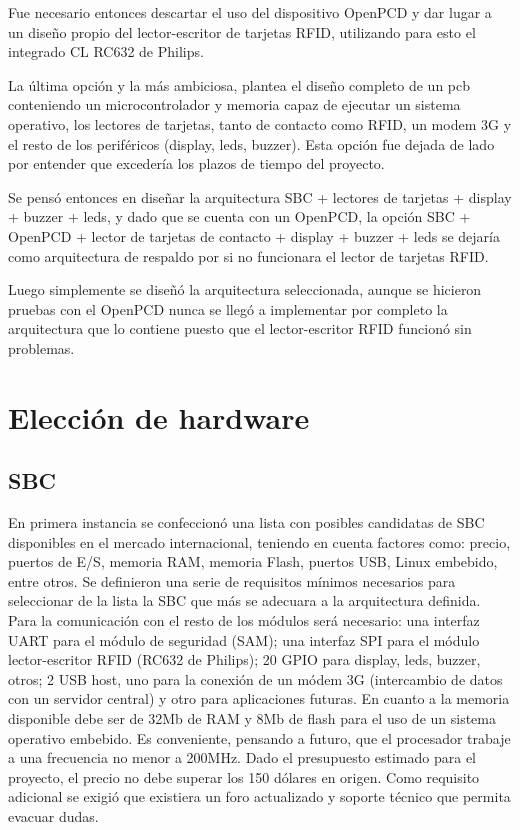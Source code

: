 Fue necesario entonces descartar el uso del dispositivo OpenPCD y dar lugar a un diseño propio del lector-escritor de tarjetas RFID, utilizando para esto el integrado CL RC632 de Philips.

La última opción y la más ambiciosa, plantea el diseño completo de un pcb conteniendo un microcontrolador y memoria capaz de ejecutar un sistema operativo, los lectores de tarjetas, tanto de contacto como RFID, un modem 3G y el resto de los periféricos (display, leds, buzzer). Esta opción fue dejada de lado por entender que excedería los plazos de tiempo del proyecto.

Se pensó entonces en diseñar la arquitectura SBC + lectores de tarjetas + display + buzzer + leds, y dado que se cuenta con un OpenPCD, la opción SBC + OpenPCD + lector de tarjetas de contacto + display + buzzer + leds se dejaría como arquitectura de respaldo por si no funcionara el lector de tarjetas RFID.

\bigskip
Luego simplemente se diseñó la arquitectura seleccionada, aunque se hicieron pruebas con el OpenPCD nunca se llegó a implementar por completo la arquitectura que lo contiene puesto que el lector-escritor RFID funcionó sin problemas.


\section{Elecci\'on de hardware}

\subsection{SBC}
En primera instancia se confeccionó una lista con posibles candidatas de SBC disponibles
en el mercado internacional, teniendo en cuenta factores como: precio, puertos de E/S, memoria RAM, memoria Flash, puertos USB, Linux embebido, entre otros.
Se definieron una serie de requisitos mínimos necesarios para seleccionar de la lista la SBC que más se adecuara a la arquitectura definida.
Para la comunicación con el resto de los módulos será necesario: una interfaz UART para el módulo de seguridad (SAM); una interfaz SPI para el módulo lector-escritor RFID (RC632 de Philips); 20 GPIO para display, leds, buzzer, otros; 2 USB host, uno para la conexión de un módem 3G (intercambio de datos con un servidor central) y otro para aplicaciones futuras. En cuanto a la memoria disponible debe ser de 32Mb de RAM y 8Mb de flash para el uso de un sistema operativo embebido. Es conveniente, pensando a futuro, que el procesador trabaje a una frecuencia no menor a 200MHz.
Dado el presupuesto estimado para el proyecto, el precio no debe superar los 150 dólares en origen.
Como requisito adicional se exigió que existiera un foro actualizado y soporte técnico que permita evacuar dudas.

